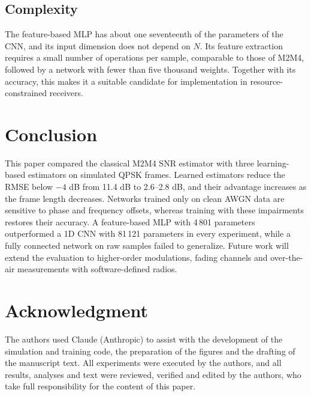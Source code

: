 \documentclass[conference]{IEEEtran}
\begin{document}
\subsection{Complexity}

The feature-based MLP has about one seventeenth of the parameters of the CNN, and its input dimension does not depend on $N$. Its feature extraction requires a small number of operations per sample, comparable to those of M2M4, followed by a network with fewer than five thousand weights. Together with its accuracy, this makes it a suitable candidate for implementation in resource-constrained receivers.

\section{Conclusion}

This paper compared the classical M2M4 SNR estimator with three learning-based estimators on simulated QPSK frames. Learned estimators reduce the RMSE below $-4$ dB from 11.4 dB to 2.6--2.8 dB, and their advantage increases as the frame length decreases. Networks trained only on clean AWGN data are sensitive to phase and frequency offsets, whereas training with these impairments restores their accuracy. A feature-based MLP with 4\,801 parameters outperformed a 1D CNN with 81\,121 parameters in every experiment, while a fully connected network on raw samples failed to generalize. Future work will extend the evaluation to higher-order modulations, fading channels and over-the-air measurements with software-defined radios.

\section*{Acknowledgment}

The authors used Claude (Anthropic) to assist with the development of the simulation and training code, the preparation of the figures and the drafting of the manuscript text. All experiments were executed by the authors, and all results, analyses and text were reviewed, verified and edited by the authors, who take full responsibility for the content of this paper.
\end{document}
